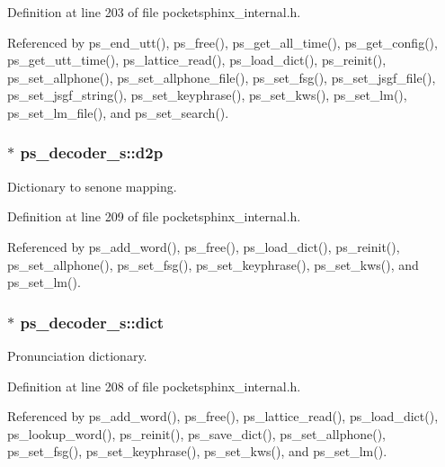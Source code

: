 Definition at line 203 of file pocketsphinx\-\_\-internal.\-h.



Referenced by ps\-\_\-end\-\_\-utt(), ps\-\_\-free(), ps\-\_\-get\-\_\-all\-\_\-time(), ps\-\_\-get\-\_\-config(), ps\-\_\-get\-\_\-utt\-\_\-time(), ps\-\_\-lattice\-\_\-read(), ps\-\_\-load\-\_\-dict(), ps\-\_\-reinit(), ps\-\_\-set\-\_\-allphone(), ps\-\_\-set\-\_\-allphone\-\_\-file(), ps\-\_\-set\-\_\-fsg(), ps\-\_\-set\-\_\-jsgf\-\_\-file(), ps\-\_\-set\-\_\-jsgf\-\_\-string(), ps\-\_\-set\-\_\-keyphrase(), ps\-\_\-set\-\_\-kws(), ps\-\_\-set\-\_\-lm(), ps\-\_\-set\-\_\-lm\-\_\-file(), and ps\-\_\-set\-\_\-search().

\subsubsection[{d2p}]{$\ast$ ps\-\_\-decoder\-\_\-s\-::d2p}\label{structps__decoder__s_ae6515cbc261686f3f3bbd95719f79793}


Dictionary to senone mapping. 



Definition at line 209 of file pocketsphinx\-\_\-internal.\-h.



Referenced by ps\-\_\-add\-\_\-word(), ps\-\_\-free(), ps\-\_\-load\-\_\-dict(), ps\-\_\-reinit(), ps\-\_\-set\-\_\-allphone(), ps\-\_\-set\-\_\-fsg(), ps\-\_\-set\-\_\-keyphrase(), ps\-\_\-set\-\_\-kws(), and ps\-\_\-set\-\_\-lm().

\subsubsection[{dict}]{$\ast$ ps\-\_\-decoder\-\_\-s\-::dict}\label{structps__decoder__s_aef6228c17907cc1d0cef835b238b5d91}


Pronunciation dictionary. 



Definition at line 208 of file pocketsphinx\-\_\-internal.\-h.



Referenced by ps\-\_\-add\-\_\-word(), ps\-\_\-free(), ps\-\_\-lattice\-\_\-read(), ps\-\_\-load\-\_\-dict(), ps\-\_\-lookup\-\_\-word(), ps\-\_\-reinit(), ps\-\_\-save\-\_\-dict(), ps\-\_\-set\-\_\-allphone(), ps\-\_\-set\-\_\-fsg(), ps\-\_\-set\-\_\-keyphrase(), ps\-\_\-set\-\_\-kws(), and ps\-\_\-set\-\_\-lm().

